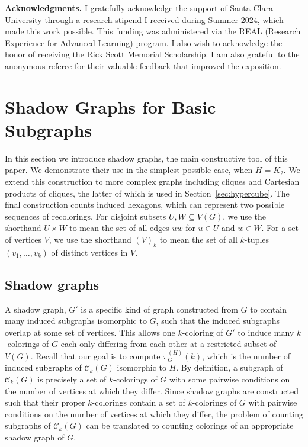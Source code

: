 \documentclass[12pt,reqno,dvipsnames]{amsart}
\theoremstyle{definition}
\begin{document}
\textbf{Acknowledgments.} I gratefully acknowledge the support of Santa Clara University through a research stipend I received during Summer 2024, which made this work possible. This funding was administered via the REAL (Research Experience for Advanced Learning) program. I also wish to acknowledge the honor of receiving the Rick Scott Memorial Scholarship. I am also grateful to the anonymous referee for their valuable feedback that improved the exposition.

\section{Shadow Graphs for Basic Subgraphs}\label{sec:examples}

In this section we introduce shadow graphs, the main constructive tool of this paper. We demonstrate their use in the simplest possible case, when $H=K_2$. We extend this construction to more complex graphs including cliques and Cartesian products of cliques, the latter of which is used in Section~\ref{sec:hypercube}. The final construction counts induced hexagons, which can represent two possible sequences of recolorings. For disjoint subsets $U, W\subseteq V(G)$, we use the shorthand $U\times W$ to mean the set of all edges $uw$ for $u\in U$ and $w\in W$. For a set of vertices $V$, we use the shorthand $(V)_k$ to mean the set of all $k$-tuples $(v_1,\dots,v_k)$ of distinct vertices in $V$.

\subsection{Shadow graphs}

A shadow graph, $G'$ is a specific kind of graph constructed from $G$ to contain many induced subgraphs isomorphic to $G$, such that the induced subgraphs overlap at some set of vertices. This allows one $k$-coloring of $G'$ to induce many $k$-colorings of $G$ each only differing from each other at a restricted subset of $V(G)$. Recall that our goal is to compute $\pi_G^{(H)}(k)$, which is the number of induced subgraphs of $\mathcal{C}_k(G)$ isomorphic to $H$. By definition, a subgraph of $\mathcal{C}_k(G)$ is precisely a set of $k$-colorings of $G$ with some pairwise conditions on the number of vertices at which they differ. Since shadow graphs are constructed such that their proper $k$-colorings contain a set of $k$-colorings of $G$ with pairwise conditions on the number of vertices at which they differ, the problem of counting subgraphs of $\mathcal{C}_k(G)$ can be translated to counting colorings of an appropriate shadow graph of $G$.
\end{document}
